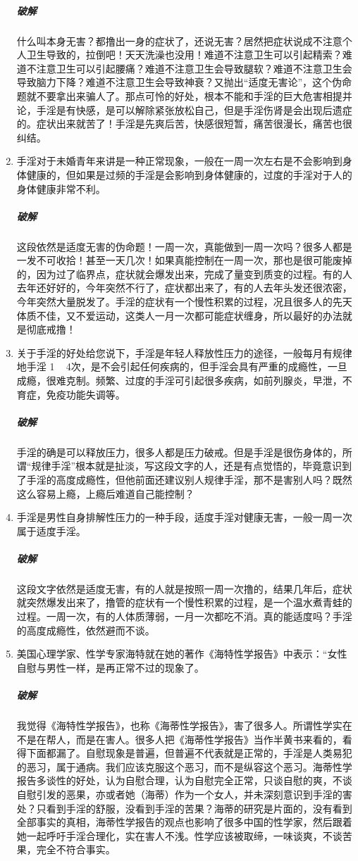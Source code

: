\begin{enumerate}
    \subparagraph{破解} 什么叫本身无害？都撸出一身的症状了，还说无害？居然把症状说成不注意个人卫生导致的，拉倒吧！天天洗澡也没用！难道不注意卫生可以引起精索？难道不注意卫生可以引起腰痛？难道不注意卫生会导致腿软？难道不注意卫生会导致脑力下降？难道不注意卫生会导致神衰？又抛出“适度无害论”，这个伪命题就不要拿出来骗人了。那点可怜的好处，根本不能和手淫的巨大危害相提并论，手淫是有快感，是可以解除紧张放松自己，但是手淫伤肾是会出现后遗症的。症状出来就苦了！手淫是先爽后苦，快感很短暂，痛苦很漫长，痛苦也很纠结。
    \item 手淫对于未婚青年来讲是一种正常现象，一般在一周一次左右是不会影响到身体健康的，但如果是过频的手淫是会影响到身体健康的，过度的手淫对于人的身体健康非常不利。
    \subparagraph{破解} 这段依然是适度无害的伪命题！一周一次，真能做到一周一次吗？很多人都是一发不可收拾！甚至一天几次！如果真能控制在一周一次，那也是很可能废掉的，因为过了临界点，症状就会爆发出来，完成了量变到质变的过程。有的人去年还好好的，今年突然不行了，症状都出来了，有的人去年头发还很浓密，今年突然大量脱发了。手淫的症状有一个慢性积累的过程，况且很多人的先天体质不佳，又不爱运动，这类人一月一次都可能症状缠身，所以最好的办法就是彻底戒撸！
    \item 关于手淫的好处给您说下，手淫是年轻人释放性压力的途径，一般每月有规律地手淫 1 ~ 4次，是不会引起任何疾病的，但手淫会具有严重的成瘾性，一旦成瘾，很难克制。频繁、过度的手淫可引起很多疾病，如前列腺炎，早泄，不育症，免疫功能失调等。
    \subparagraph{破解} 手淫的确是可以释放压力，很多人都是压力破戒。但是手淫是很伤身体的，所谓“规律手淫”根本就是扯淡，写这段文字的人，还是有点觉悟的，毕竟意识到了手淫的高度成瘾性，但他前面还建议别人规律手淫，那不是害别人吗？既然这么容易上瘾，上瘾后难道自己能控制？
    \item 手淫是男性自身排解性压力的一种手段，适度手淫对健康无害，一般一周一次属于适度手淫。
    \subparagraph{破解} 这段文字依然是适度无害，有的人就是按照一周一次撸的，结果几年后，症状就突然爆发出来了，撸管的症状有一个慢性积累的过程，是一个温水煮青蛙的过程。一周一次，有的人体质薄弱，一月一次都吃不消。真的能适度吗？手淫的高度成瘾性，依然避而不谈。
    \item 美国心理学家、性学专家海特就在她的著作《海特性学报告》中表示：“女性自慰与男性一样，是再正常不过的现象了。
    \subparagraph{破解} 我觉得《海特性学报告》，也称《海蒂性学报告》，害了很多人。所谓性学实在不是在帮人，而是在害人。很多人把《海蒂性学报告》当作半黄书来看的，看得下面都漏了。自慰现象是普遍，但普遍不代表就是正常的，手淫是人类易犯的恶习，属于通病。我们应该克服这个恶习，而不是纵容这个恶习。海蒂性学报告多谈性的好处，认为自慰合理，认为自慰完全正常，只谈自慰的爽，不谈自慰引发的恶果，亦或者她（海蒂）作为一个女人，并未深刻意识到手淫的害处？只看到手淫的舒服，没看到手淫的苦果？海蒂的研究是片面的，没有看到全部事实的真相，海蒂性学报告的观点也影响了很多中国的性学家，然后跟着她一起呼吁手淫合理化，实在害人不浅。性学应该被取缔，一味谈爽，不谈苦果，完全不符合事实。

\end{enumerate}
